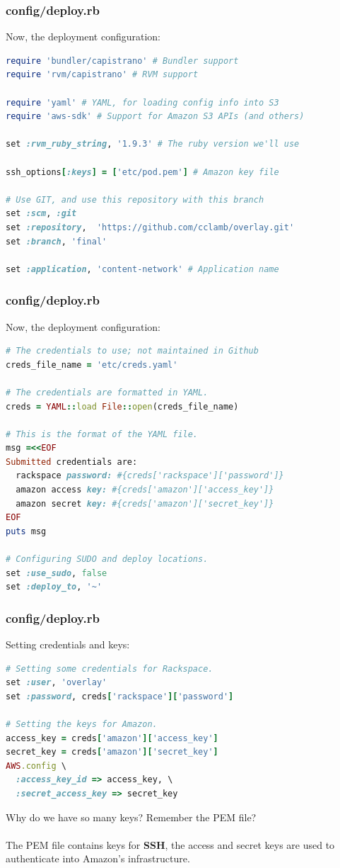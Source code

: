 \documentclass[t,handout]{beamer}
\begin{document}
\begin{frame}[fragile]
\frametitle{config/deploy.rb}
Now, the deployment configuration:
\begin{lstlisting}[frame=none,language=Ruby,basicstyle=\scriptsize\ttfamily\color{black},commentstyle=\scriptsize\ttfamily\color{red}]
require 'bundler/capistrano' # Bundler support
require 'rvm/capistrano' # RVM support

require 'yaml' # YAML, for loading config info into S3
require 'aws-sdk' # Support for Amazon S3 APIs (and others)

set :rvm_ruby_string, '1.9.3' # The ruby version we'll use

ssh_options[:keys] = ['etc/pod.pem'] # Amazon key file

# Use GIT, and use this repository with this branch
set :scm, :git
set :repository,  'https://github.com/cclamb/overlay.git'
set :branch, 'final'

set :application, 'content-network' # Application name
\end{lstlisting}
\end{frame}

\begin{frame}[fragile]
\frametitle{config/deploy.rb}
Now, the deployment configuration:
\begin{lstlisting}[frame=none,language=Ruby,basicstyle=\scriptsize\ttfamily\color{black},commentstyle=\scriptsize\ttfamily\color{red}]
# The credentials to use; not maintained in Github
creds_file_name = 'etc/creds.yaml'

# The credentials are formatted in YAML.
creds = YAML::load File::open(creds_file_name)

# This is the format of the YAML file.
msg =<<EOF
Submitted credentials are:
  rackspace password: #{creds['rackspace']['password']}
  amazon access key: #{creds['amazon']['access_key']}
  amazon secret key: #{creds['amazon']['secret_key']}
EOF
puts msg

# Configuring SUDO and deploy locations.
set :use_sudo, false
set :deploy_to, '~'
\end{lstlisting}
\end{frame}

\begin{frame}[fragile]
\frametitle{config/deploy.rb}
Setting credentials and keys:
\begin{lstlisting}[frame=none,language=Ruby,basicstyle=\scriptsize\ttfamily\color{black},commentstyle=\scriptsize\ttfamily\color{red}]
# Setting some credentials for Rackspace.
set :user, 'overlay'
set :password, creds['rackspace']['password']

# Setting the keys for Amazon.
access_key = creds['amazon']['access_key']
secret_key = creds['amazon']['secret_key']
AWS.config \
  :access_key_id => access_key, \
  :secret_access_key => secret_key
\end{lstlisting}
Why do we have so many keys? Remember the PEM file?\\~\\
The PEM file contains keys for {\bf SSH}, the access and secret keys are used to authenticate into Amazon's infrastructure.
\end{frame}
\end{document}
